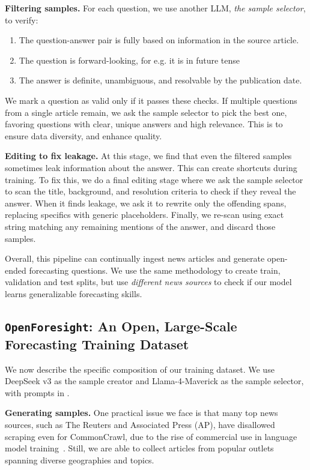 \documentclass{article} %
\newcommand{\ourdataset}{\texttt{OpenForesight}}
\begin{document}
 \textbf{Filtering samples.} For each question, we use another LLM, \textit{the sample selector}, to verify:
\begin{enumerate}
    \item The question-answer pair is fully based on information in the source article.
    \item The question is forward-looking, for e.g. it is in future tense
    \item The answer is definite, unambiguous, and resolvable by the publication date.
\end{enumerate}
We mark a question as valid only if it passes these checks. If multiple questions from a single article remain, we ask the sample selector to pick the best one, favoring questions with clear, unique answers and high relevance. This is to ensure data diversity, and enhance quality. \vspace{0.15cm}

 \textbf{Editing to fix leakage.} At this stage, we find that even the filtered samples sometimes leak information about the answer. This can create shortcuts during training. To fix this, we do a final editing stage where we ask the sample selector to scan the title, background, and resolution criteria to check if they reveal the answer. When it finds leakage, we ask it to rewrite only the offending spans, replacing specifics with generic placeholders. Finally, we re-scan using exact string matching any remaining mentions of the answer, and discard those samples.

Overall, this pipeline can continually ingest news articles and generate open-ended forecasting questions. We use the same methodology to create train, validation and test splits, but use \textit{different news sources} to check if our model learns generalizable forecasting skills. 

\subsection{\ourdataset: An Open, Large-Scale Forecasting Training Dataset}

We now describe the specific composition of our training dataset. We use DeepSeek v3 as the sample creator and Llama-4-Maverick as the sample selector, with prompts in .

\textbf{Generating samples.} One practical issue we face is that many top news sources, such as The Reuters and Associated Press (AP), have disallowed scraping even for CommonCrawl, due to the rise of commercial use in language model training~\citep{grynbaum2023times,longpre_consent_2025}. Still, we are able to collect articles from popular outlets spanning diverse geographies and topics. 
\end{document}
